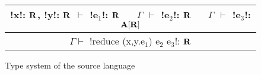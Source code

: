 \begin{figure*}[tb]
    \begin{tabular}{c}
        !x!: $\mathbf{R}$, !y!: $\mathbf{R}$ $\vdash$ !e$_1$!: $\mathbf{R}$ 
        $\quad$ $\Gamma$ $\vdash$ !e$_2$!: $\mathbf{R}$
        $\quad$ $\Gamma$ $\vdash$ !e$_3$!: $\mathbf{A}[\mathbf{R}]$
        \\\hline  
        $\Gamma \vdash$ !reduce (x,y.e$_1$) e$_2$ e$_3$!: $\mathbf{R}$
    \end{tabular}
    \vspace{-0.2cm}
    \caption{Type system of the source language}
    \vspace{-0.4cm}
    \label{fig:source_typesystem}
    \end{figure*}